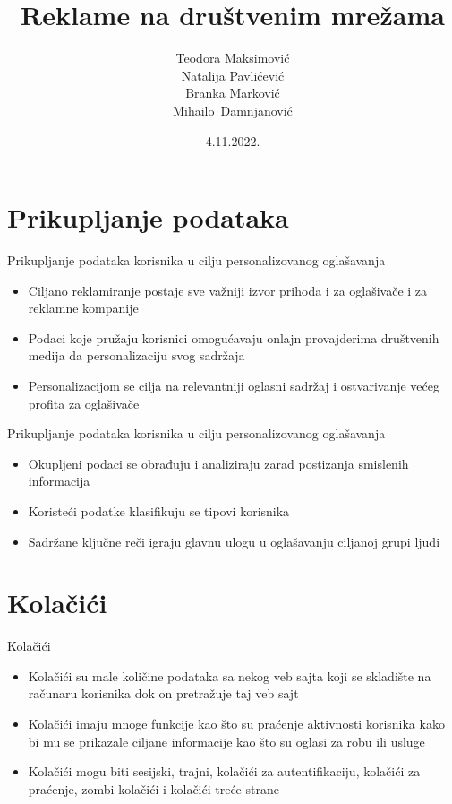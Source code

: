 \documentclass{beamer}
\title{Reklame na društvenim mrežama}
\author[Maksimović,Pavlićević,Marković,Damnjanović  ]{Teodora Maksimović\\Natalija Pavlićević\\
	Branka Marković\\Mihailo~Damnjanović}
\institute[]{Matematički fakultet, Univerzitet u Beogradu}
\date{4.11.2022.}
\begin{document}
	
	\frame{\titlepage}
	
	\section{Prikupljanje podataka}
	\begin{frame}{Prikupljanje podataka korisnika u cilju personalizovanog oglašavanja}
		\begin{itemize}
			\item Ciljano reklamiranje postaje sve važniji izvor prihoda i za oglašivače i za reklamne kompanije
			\item Podaci koje pružaju korisnici omogućavaju onlajn provajderima društvenih medija da personalizaciju svog sadržaja
			\item Personalizacijom se cilja na relevantniji oglasni sadržaj i ostvarivanje većeg profita za oglašivače		\end{itemize}
	\end{frame}
	
	
	\begin{frame}{Prikupljanje podataka korisnika u cilju personalizovanog oglašavanja}
		\begin{itemize}
			\item Okupljeni podaci se obrađuju i analiziraju zarad postizanja smislenih informacija
			\item Koristeći podatke klasifikuju se tipovi korisnika \item Sadržane ključne reči igraju glavnu ulogu u oglašavanju ciljanoj grupi ljudi 
		\end{itemize}
	\end{frame}
	
	\section{Kolačići}
	\begin{frame}{Kolačići}
		\begin{itemize}
			\item Kolačići su male količine podataka sa nekog veb sajta koji se skladište na računaru korisnika dok on pretražuje taj veb sajt
			\item Kolačići imaju mnoge funkcije kao što su praćenje aktivnosti korisnika kako bi mu se prikazale ciljane informacije kao što su oglasi za robu ili usluge
			\item Kolačići mogu biti sesijski, trajni, kolačići za autentifikaciju, kolačići za praćenje, zombi kolačići i kolačići treće strane
		\end{itemize}
		
	\end{frame}
	
\end{document}
